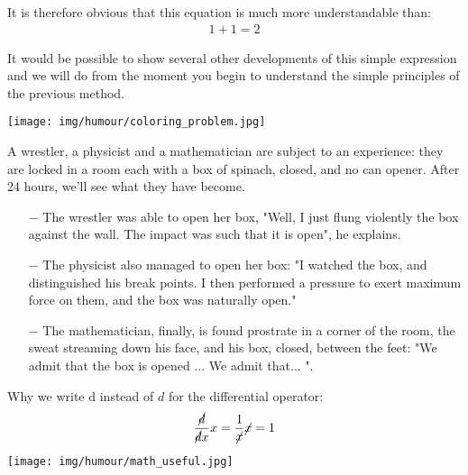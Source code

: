 	It is therefore obvious that this equation is much more understandable than:
	\begin{gather*}
	1+1=2
	\end{gather*}
	
	It would be possible to show several other developments of this simple expression and we will do from the moment you begin to understand the simple principles of the previous method.
	\begin{center}\underline{\hspace{5 cm}}\end{center}
	\begin{center}
		\texttt{[image: img/humour/coloring\_problem.jpg]}	
	\end{center}

	A wrestler, a physicist and a mathematician are subject to an experience: they are locked in a room each with a box of spinach, closed, and no can opener. After 24 hours, we'll see what they have become.
	
	\begin{itemize}	 
		\item[$-$] The wrestler was able to open her box, "Well, I just flung violently the box against the wall. The impact was such that it is open", he explains.
	
		\item[$-$] The physicist also managed to open her box: "I watched the box, and distinguished his break points. I then performed a pressure to exert maximum force on them, and the box was naturally open."
	
		\item[$-$] The mathematician, finally, is found prostrate in a corner of the room, the sweat streaming down his face, and his box, closed, between the feet: "We admit that the box is opened ... We admit that... ".
	\end{itemize}
	\begin{center}\underline{\hspace{5 cm}}\end{center}
	Why we write $\mathrm{d}$ instead of $d$ for the differential operator:
	\begin{gather*}
		\dfrac{\cancel{d}}{\cancel{d}x}x=\dfrac{1}{\cancel{x}}\cancel{x}=1	
	\end{gather*}
	
	\begin{center}
		\texttt{[image: img/humour/math\_useful.jpg]}	
	\end{center}

